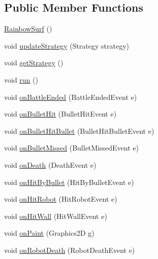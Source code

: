 \subsection*{Public Member Functions}
\begin{DoxyCompactItemize}
\item 
\hyperlink{classmega_1_1boirlerplate_1_1_rainbow_surf_ac796f78a606c23cc5d868106e7ff2e25}{Rainbow\+Surf} ()
\item 
void \hyperlink{classmega_1_1boirlerplate_1_1_rainbow_surf_aea60c20e73fd0d6a9c9f03aedb629691}{update\+Strategy} (Strategy strategy)
\item 
void \hyperlink{classmega_1_1boirlerplate_1_1_rainbow_surf_a41d9a00a7815f330e689cfe289f8900d}{get\+Strategy} ()
\item 
void \hyperlink{classmega_1_1boirlerplate_1_1_rainbow_surf_a88781c384a36b2bfde150cd613211911}{run} ()
\item 
void \hyperlink{classmega_1_1boirlerplate_1_1_rainbow_surf_a0767bf09dcfb8a5a210e8fb4d514a24f}{on\+Battle\+Ended} (Battle\+Ended\+Event e)
\item 
void \hyperlink{classmega_1_1boirlerplate_1_1_rainbow_surf_a616040bd54522fd284b42015bac73e19}{on\+Bullet\+Hit} (Bullet\+Hit\+Event e)
\item 
void \hyperlink{classmega_1_1boirlerplate_1_1_rainbow_surf_a66199cea8d92d0e41a2dddd9c9bd6ce6}{on\+Bullet\+Hit\+Bullet} (Bullet\+Hit\+Bullet\+Event e)
\item 
void \hyperlink{classmega_1_1boirlerplate_1_1_rainbow_surf_acf66c0564f62a1d8bcc3e4e341eaeb38}{on\+Bullet\+Missed} (Bullet\+Missed\+Event e)
\item 
void \hyperlink{classmega_1_1boirlerplate_1_1_rainbow_surf_ac9b0d368c6ec4d29349d7b1cd8250a97}{on\+Death} (Death\+Event e)
\item 
void \hyperlink{classmega_1_1boirlerplate_1_1_rainbow_surf_a0ce5247ce635fc4a1bdf0a8273e63bb1}{on\+Hit\+By\+Bullet} (Hit\+By\+Bullet\+Event e)
\item 
void \hyperlink{classmega_1_1boirlerplate_1_1_rainbow_surf_aa0d41311ee9ff27eb5b288d158ed20b2}{on\+Hit\+Robot} (Hit\+Robot\+Event e)
\item 
void \hyperlink{classmega_1_1boirlerplate_1_1_rainbow_surf_a6b1050af9104547456cc16e965af4d1f}{on\+Hit\+Wall} (Hit\+Wall\+Event e)
\item 
void \hyperlink{classmega_1_1boirlerplate_1_1_rainbow_surf_a822b53015b423e18738e9d6f32d41e38}{on\+Paint} (Graphics2D g)
\item 
void \hyperlink{classmega_1_1boirlerplate_1_1_rainbow_surf_a97d9c9167912991354219f216293fcb5}{on\+Robot\+Death} (Robot\+Death\+Event e)

\end{DoxyCompactItemize}
